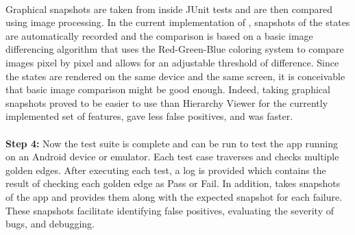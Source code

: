 \\
\indent
Graphical snapshots are taken from inside JUnit tests and are then compared using image processing. In the current implementation of \tool{}, snapshots of the states are automatically recorded and the comparison is based on a basic image differencing algorithm that uses the Red-Green-Blue coloring system to compare images pixel by pixel and allows for an adjustable threshold of difference.
Since the states are rendered on the same device and the same screen, it is conceivable that basic image comparison might be good enough. Indeed, taking graphical snapshots proved to be easier to use than Hierarchy Viewer for the currently implemented set of features, gave less false positives, and was faster.
\\
%
\indent
\\
\indent
{\bf Step 4:}
Now the test suite is complete and can be run to test the app running on an Android device or emulator.
Each test case traverses and checks multiple golden edges. After executing each test, a log is provided which contains the result of checking each golden edge as Pass or Fail. In addition, \tool{} takes snapshots of the app and provides them along with the expected snapshot for each failure. These snapshots facilitate identifying false positives, evaluating the severity of bugs, and debugging.
